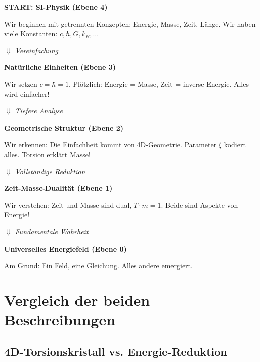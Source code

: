 \begin{philosophical}
\textbf{START: SI-Physik (Ebene 4)}

Wir beginnen mit getrennten Konzepten: Energie, Masse, Zeit, Länge. Wir haben viele Konstanten: $c, \hbar, G, k_B, \ldots$

\vspace{0.3cm}

$\Downarrow$ \textit{Vereinfachung}

\vspace{0.3cm}

\textbf{Natürliche Einheiten (Ebene 3)}

Wir setzen $c = \hbar = 1$. Plötzlich: Energie = Masse, Zeit = inverse Energie. Alles wird einfacher!

\vspace{0.3cm}

$\Downarrow$ \textit{Tiefere Analyse}

\vspace{0.3cm}

\textbf{Geometrische Struktur (Ebene 2)}

Wir erkennen: Die Einfachheit kommt von 4D-Geometrie. Parameter $\xi$ kodiert alles. Torsion erklärt Masse!

\vspace{0.3cm}

$\Downarrow$ \textit{Vollständige Reduktion}

\vspace{0.3cm}

\textbf{Zeit-Masse-Dualität (Ebene 1)}

Wir verstehen: Zeit und Masse sind dual, $T \cdot m = 1$. Beide sind Aspekte von Energie!

\vspace{0.3cm}

$\Downarrow$ \textit{Fundamentale Wahrheit}

\vspace{0.3cm}

\textbf{Universelles Energiefeld (Ebene 0)}

Am Grund: Ein Feld, eine Gleichung. Alles andere emergiert.
\end{philosophical}

\section{Vergleich der beiden Beschreibungen}

\subsection{4D-Torsionskristall vs. Energie-Reduktion}

